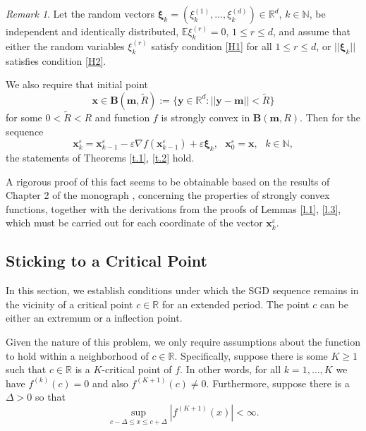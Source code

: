 \documentclass{article}
\theoremstyle{plain}
\theoremstyle{definition}
\theoremstyle{remark}
\newtheorem{remark}[theorem]{Remark}
\begin{document}
\begin{remark}
   Let the random vectors $\boldsymbol{\xi}_k=(\xi_k^{(1)},\dots,\xi_k^{(d)})\in \mathbb{R}^d$, $k\in \mathbb{N}$, be independent and identically distributed, $\mathbb{E}\xi_k^{(r)}=0$, $1\leq r \leq d$, and assume that either the random variables $\xi_k^{(r)}$ satisfy condition \ref{H1} for all $1\leq r \leq d$, or $||\boldsymbol{\xi}_k||$ satisfies condition \ref{H2}.

We also require that initial point
$$
\boldsymbol{x}\in \boldsymbol{B}(\boldsymbol{m}, \tilde{R}):=\{\boldsymbol{y}\in\mathbb{R}^d:||\boldsymbol{y}-\boldsymbol{m}||<\tilde{R}\}
$$
for some $0<\tilde{R}<R$  
and function $f$  is strongly convex
in $\boldsymbol{B}(\boldsymbol{m},R)$.
Then for the sequence
$$
\boldsymbol{x}_k^{\varepsilon}=\boldsymbol{x}_{k-1}^{\varepsilon}-\varepsilon \nabla f(\boldsymbol{x}_{k-1}^{\varepsilon})+\varepsilon \boldsymbol{\xi}_k, \ \ \ \boldsymbol{x}_0^{\varepsilon}=\boldsymbol{x}, \ \ \ k\in \mathbb{N},
$$
the statements of Theorems \ref{t.1},
\ref{t.2} hold.

A rigorous proof of this fact seems to be obtainable based on the results of Chapter 2 of the monograph \citet{nesterov2004introductory}, concerning the properties of strongly convex functions, together with the derivations from the proofs of Lemmas \ref{l.1}, \ref{l.3}, which must be carried out for each coordinate of the vector
$\boldsymbol{x}_k^{\varepsilon}$.
\end{remark}


\subsection{Sticking to a Critical Point}\label{sec_stic_crit_point}

In this section, we establish conditions under which the SGD sequence remains in the vicinity of a critical point $c \in \mathbb{R}$ for an extended period. The point $c$ can be either an extremum or a inflection point.

Given the nature of this problem, we only require assumptions about the function to hold within a neighborhood of $c \in \mathbb{R}$. Specifically, suppose there is some $K \geqslant 1$ such that $c \in \mathbb{R}$ is a $K$-critical point of $f$. In other words, for all $k = 1, \ldots, K$ we have $f^{(k)}(c) = 0$ and also $f^{(K+1)}(c) \neq 0$. Furthermore, suppose there is a $\Delta > 0$ so that
\[
\sup_{c - \Delta \leqslant x \leqslant c + \Delta} |f^{(K+1)}(x)| < \infty.
\]
\end{document}
